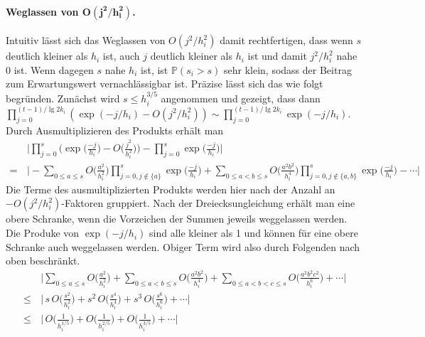 \documentclass[a4paper, 10pt, ngerman]{article}
\renewcommand{\P}{\mathbb{P}}
\begin{document}
\paragraph{Weglassen von $\pmb{O(j^2/h_i^2)}$.} Intuitiv lässt sich das Weglassen von $O(j^2/h_i^2)$ damit rechtfertigen, dass wenn $s$ deutlich kleiner als $h_i$ ist, auch $j$ deutlich kleiner als $h_i$ ist und damit $j^2/h_i^2$ nahe 0 ist. Wenn dagegen $s$ nahe $h_i$ ist, ist $\P(s_i > s)$ sehr klein, sodass der Beitrag zum Erwartungswert vernachlässigbar ist. Präzise lässt sich das wie folgt begründen. Zunächst wird $s \le h_{i}^{3/5}$ angenommen und gezeigt, dass dann $\prod_{j = 0}^{(t-1) / \lg 2k_i} (\exp (-j/h_i) - O (j^2/h_i^2)) \sim \prod_{j = 0}^{(t-1) / \lg 2k_i} \exp (-j/h_i)$. Durch Ausmultiplizieren des Produkts erhält man
\begin{align*}
         & \Bigg \vert
    \prod_{j = 0}^{s} \Bigg ( \exp \bigg ( \frac {-j}{h_i} \bigg )
    - O \bigg ( \frac {j^2} {h_i^2} \bigg ) \Bigg )
    - \prod_{j = 0}^{s} \exp \bigg ( \frac {-j}{h_i} \bigg )
    \Bigg \vert        \\
    = \, & \Bigg \vert
    - \sum_{0 \le a \le s} O \bigg ( \frac {a^2} {h_i^2} \bigg )
    \prod_{j = 0, j \notin \{a\}}^{s} \exp \bigg ( \frac {-j}{h_i} \bigg )
    + \sum_{0 \le a < b \le s} O \bigg ( \frac {a^2b^2} {h_i^4} \bigg )
    \prod_{j = 0, j \notin \{a, b\}}^{s}
    \exp \bigg ( \frac {-j}{h_i} \bigg ) - \cdots
    \Bigg \vert
\end{align*}
Die Terme des ausmultiplizierten Produkts werden hier nach der Anzahl an $-O(j^2/h_i^2)$-Faktoren gruppiert. Nach der Dreiecksungleichung erhält man eine obere Schranke, wenn die Vorzeichen der Summen jeweils weggelassen werden. Die Produke von $\exp(-j/h_i)$ sind alle kleiner als 1 und können für eine obere Schranke auch weggelassen werden. Obiger Term wird also durch Folgenden nach oben beschränkt.
\begin{align*}
           & \Bigg \vert
    \sum_{0 \le a \le s} O \bigg ( \frac {a^2} {h_i^2} \bigg )
    + \sum_{0 \le a < b \le s} O \bigg ( \frac {a^2b^2} {h_i^4} \bigg )
    + \sum_{0 \le a < b < c \le s} O \bigg ( \frac {a^2b^2c^2} {h_i^6} \bigg )
    + \cdots
    \Bigg \vert             \\
    \le \, & \Bigg \vert \,
    s \, O \bigg ( \frac {s^2} {h_i^2} \bigg )
    + s^2 \, O \bigg ( \frac {s^4} {h_i^4} \bigg )
    + s^3 \,  O \bigg ( \frac {s^6} {h_i^6} \bigg )
    + \cdots
    \Bigg \vert             \\
    \le \, & \Bigg \vert \,
    O \bigg ( \frac 1 {h_i^{1/5}} \bigg )
    + O \bigg ( \frac 1 {h_i^{2/5}} \bigg )
    + O \bigg ( \frac 1 {h_i^{3/5}} \bigg )
    + \cdots
    \Bigg \vert
\end{align*}
\end{document}
